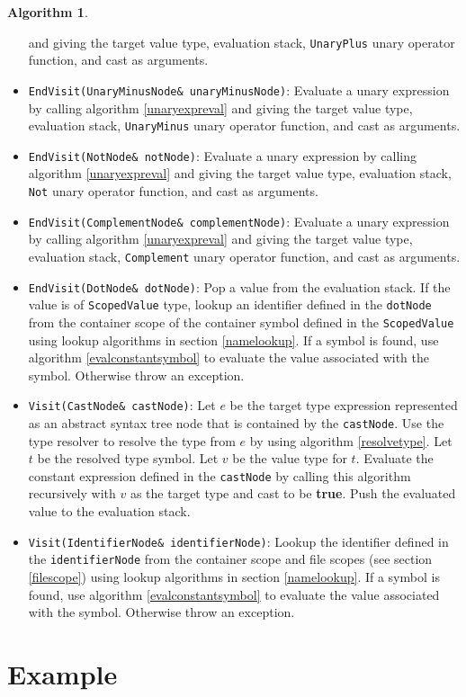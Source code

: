 \documentclass[a4paper,oneside,11pt]{book}
\theoremstyle{definition}
\newtheorem{algo}{Algorithm}[section]
\begin{document}
\begin{algo}
\begin{itemize}
and giving the target value type, evaluation stack, \verb|UnaryPlus| unary operator function, and cast as arguments.
\item
\verb|EndVisit(UnaryMinusNode& unaryMinusNode)|:
Evaluate a unary expression by calling algorithm \ref{unaryexpreval}
and giving the target value type, evaluation stack, \verb|UnaryMinus| unary operator function, and cast as arguments.
\item
\verb|EndVisit(NotNode& notNode)|:
Evaluate a unary expression by calling algorithm \ref{unaryexpreval}
and giving the target value type, evaluation stack, \verb|Not| unary operator function, and cast as arguments.
\item
\verb|EndVisit(ComplementNode& complementNode)|:
Evaluate a unary expression by calling algorithm \ref{unaryexpreval}
and giving the target value type, evaluation stack, \verb|Complement| unary operator function, and cast as arguments.
\item
\verb|EndVisit(DotNode& dotNode)|:
Pop a value from the evaluation stack.
If the value is of \verb|ScopedValue| type, lookup an identifier defined in the \verb|dotNode| from the container scope of the container symbol defined in the
\verb|ScopedValue| using lookup algorithms in section \ref{namelookup}.
If a symbol is found, use algorithm \ref{evalconstantsymbol} to evaluate the value associated with the symbol.
Otherwise throw an exception.
\item
\verb|Visit(CastNode& castNode)|:
Let $e$ be the target type expression represented as an abstract syntax tree node that is contained by the \verb|castNode|.
Use the type resolver to resolve the type from $e$ by using algorithm \ref{resolvetype}. Let $t$ be the resolved type symbol.
Let $v$ be the value type for $t$.
Evaluate the constant expression defined in the \verb|castNode| by calling this algorithm recursively with $v$ as the target type and cast to be \textbf{true}.
Push the evaluated value to the evaluation stack.
\item
\verb|Visit(IdentifierNode& identifierNode)|:
Lookup the identifier defined in the \verb|identifierNode| from the container scope and file scopes (see section \ref{filescope})
using lookup algorithms in section \ref{namelookup}.
If a symbol is found, use algorithm \ref{evalconstantsymbol} to evaluate the value associated with the symbol.
Otherwise throw an exception.
\end{itemize}
\end{algo}

\clearpage
\section{Example}
\end{document}
